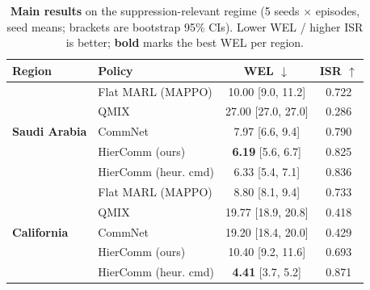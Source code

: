\begin{table}[t]
\centering
\caption{\textbf{Main results} on the suppression-relevant regime (5 seeds $\times$ episodes, seed means; brackets are bootstrap 95\% CIs). Lower WEL / higher ISR is better; \textbf{bold} marks the best WEL per region.}
\label{tab:main_results}
\begin{tabular}{llcc}
\toprule
Region & Policy & WEL $\downarrow$ & ISR $\uparrow$ \\
\midrule
\multirow{5}{*}{\textbf{Saudi Arabia}}
& Flat MARL (MAPPO) & 10.00 \small{[9.0, 11.2]} & 0.722 \\
& QMIX & 27.00 \small{[27.0, 27.0]} & 0.286 \\
& CommNet & 7.97 \small{[6.6, 9.4]} & 0.790 \\
& HierComm (ours) & \textbf{6.19} \small{[5.6, 6.7]} & 0.825 \\
& HierComm (heur. cmd) & 6.33 \small{[5.4, 7.1]} & 0.836 \\
\midrule
\multirow{5}{*}{\textbf{California}}
& Flat MARL (MAPPO) & 8.80 \small{[8.1, 9.4]} & 0.733 \\
& QMIX & 19.77 \small{[18.9, 20.8]} & 0.418 \\
& CommNet & 19.20 \small{[18.4, 20.0]} & 0.429 \\
& HierComm (ours) & 10.40 \small{[9.2, 11.6]} & 0.693 \\
& HierComm (heur. cmd) & \textbf{4.41} \small{[3.7, 5.2]} & 0.871 \\
\bottomrule
\end{tabular}
\end{table}

